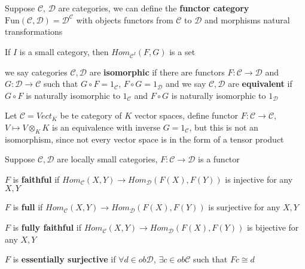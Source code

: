 \documentclass[../main.tex]{subfiles}
\begin{document}
\begin{definition}
Suppose $\mathscr C$, $\mathscr D$ are categories, we can define the \textbf{functor category} $\mathrm{Fun}(\mathscr C,\mathscr D)=\mathscr D^{\mathscr C}$ with objects functors from $\mathscr C$ to $\mathscr D$ and morphisms natural transformations
\end{definition}

\begin{remark}
If $I$ is a small category, then $Hom_{\mathscr C^I}(F,G)$ is a set
\end{remark}

\begin{definition}
we say categories $\mathscr C,\mathscr D$ are \textbf{isomorphic} if there are functors $F:\mathscr C\to\mathscr D$ and $G:\mathscr D\to\mathscr C$ such that $G\circ F=1_\mathscr{C}$, $F\circ G=1_\mathscr{D}$ and we say $\mathscr C,\mathscr D$ are \textbf{equivalent} if $G\circ F$ is naturally isomorphic to $1_\mathscr{C}$ and $F\circ G$ is naturally isomorphic to $1_\mathscr{D}$
\end{definition}

\begin{example}
Let $\mathscr C=Vect_K$ be te category of $K$ vector spaces, define functor $F:\mathscr C\to\mathscr C$, $V\mapsto V\otimes_KK$ is an equivalence with inverse $G=1_{\mathscr C}$, but this is not an isomorphism, since not every vector space is in the form of a tensor product
\end{example}

\begin{definition}
Suppose $\mathscr C,\mathscr D$ are locally small categories, $F:\mathscr C\to\mathscr D$ is a functor \par
$F$ is \textbf{faithful} if $Hom_{\mathscr C}(X,Y)\to Hom_{\mathscr D}(F(X),F(Y))$ is injective for any $X,Y$ \par
$F$ is \textbf{full} if $Hom_{\mathscr C}(X,Y)\to Hom_{\mathscr D}(F(X),F(Y))$ is surjective for any $X,Y$ \par
$F$ is \textbf{fully faithful} if $Hom_{\mathscr C}(X,Y)\to Hom_{\mathscr D}(F(X),F(Y))$ is bijective for any $X,Y$ \par
$F$ is \textbf{essentially surjective} if $\forall d\in ob\mathscr D$, $\exists c\in ob\mathscr C$ such that $Fc\cong d$
\end{definition}
\end{document}
